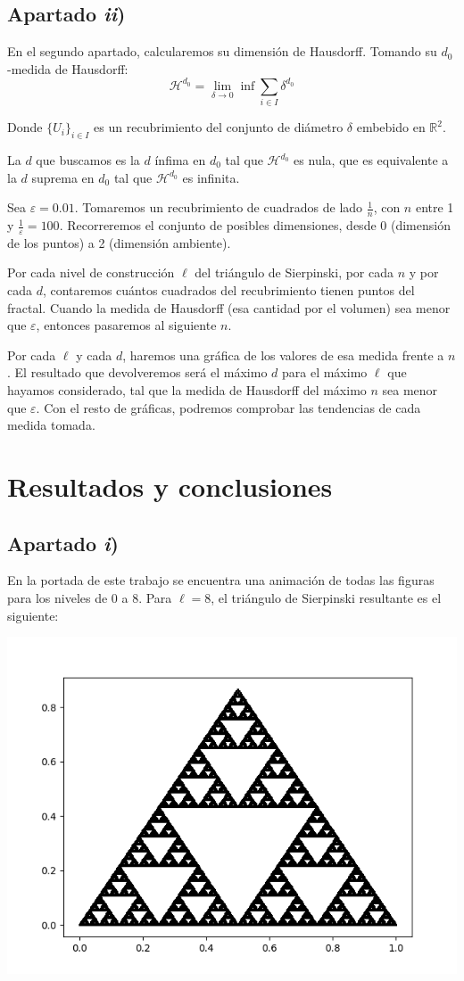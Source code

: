 \documentclass[a4paper]{article}
\begin{document}
	\subsection{Apartado \textit{ii})}
	En el segundo apartado, calcularemos su dimensión de Hausdorff. Tomando su ${d_0}$-medida de Hausdorff:
	\[ \mathcal{H}^{d_0} = \lim_{\delta\to 0}  \inf{\sum_{i\in I} \delta^{d_0}} \]
	
	Donde $\{U_i\}_{i\in I}$ es un recubrimiento del conjunto de diámetro $\delta$ embebido en $\mathbb{R}^2$.
	
	La $d$ que buscamos es la $d$ ínfima en $d_0$ tal que $\mathcal{H}^{d_0}$ es nula, que es equivalente a la $d$ suprema en $d_0$ tal que $\mathcal{H}^{d_0}$ es infinita.
	
	Sea $\varepsilon=0.01$. Tomaremos un recubrimiento de cuadrados de lado $\frac{1}{n}$, con $n$ entre 1 y $\frac{1}{\varepsilon}=100$. Recorreremos el conjunto de posibles dimensiones, desde 0 (dimensión de los puntos) a 2 (dimensión ambiente). 
	
	Por cada nivel de construcción $\ell$ del triángulo de Sierpinski, por cada $n$ y por cada $d$, contaremos cuántos cuadrados del recubrimiento tienen puntos del fractal. Cuando la medida de Hausdorff (esa cantidad por el volumen) sea menor que $\varepsilon$, entonces pasaremos al siguiente $n$.
	
	Por cada $\ell$ y cada $d$, haremos una gráfica de los valores de esa medida frente a $n$. El resultado que devolveremos será el máximo $d$ para el máximo $\ell$ que hayamos considerado, tal que la medida de Hausdorff del máximo $n$ sea menor que $\varepsilon$. Con el resto de gráficas, podremos comprobar las tendencias de cada medida tomada.

	
	\section{Resultados y conclusiones}
	\subsection{Apartado \textit{i})}
	En la portada de este trabajo se encuentra una animación de todas las figuras para los niveles de 0 a 8. Para $\ell=8$, el triángulo de Sierpinski resultante es el siguiente:
	
\begin{center}
		\includegraphics[width=0.5\linewidth]{img/triangle8}
\end{center}
	
\end{document}

